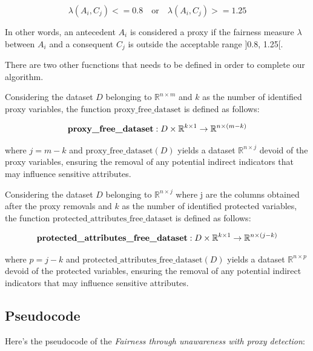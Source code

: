 \documentclass[12pt,a4paper,openright,twoside]{book}
\begin{document}
\[\lambda(A_i, C_j) <= 0.8 \quad \text{or} \quad \lambda(A_i, C_j) >= 1.25\]

In other words, an antecedent \( A_i \) is considered a proxy if the fairness measure \( \lambda \) between \( A_i \) and a consequent \( C_j \) is outside the acceptable range ]0.8, 1.25[.




There are two other fucnctions that needs to be defined in order to complete our algorithm.




Considering the dataset \( D \) belonging to \( \mathbb{R}^{n \times m} \) and \( k \) as the number of identified proxy variables, the function \( \text{proxy\_free\_dataset} \) is defined as follows:

\[
\text{\textbf{proxy\_free\_dataset}}: D \times \mathbb{R}^{k \times 1} \rightarrow \mathbb{R}^{n \times (m - k)}
\]

where \( j = m - k \) and \( \text{proxy\_free\_dataset}(D) \) yields a dataset \( \mathbb{R}^{n \times j} \) devoid of the proxy variables, ensuring the removal of any potential indirect indicators that may influence sensitive attributes. 



Considering the dataset \( D \) belonging to \( \mathbb{R}^{n \times j} \) where j are the columns obtained after the proxy removals and \( k \) as the number of identified protected variables, the function \( \text{protected\_attributes\_free\_dataset} \) is defined as follows:

\[
\text{\textbf{protected\_attributes\_free\_dataset}}: D \times \mathbb{R}^{k \times 1} \rightarrow \mathbb{R}^{n \times (j - k)}
\]

where \( p = j - k \) and \( \text{protected\_attributes\_free\_dataset}(D) \) yields a dataset \( \mathbb{R}^{n \times p} \) devoid of the protected variables, ensuring the removal of any potential indirect indicators that may influence sensitive attributes.

\subsection{Pseudocode}
Here's the pseudocode of the \emph{Fairness through unawareness with proxy detection}:

\begin{algorithm}[H]
\end{algorithm}
\end{document}
